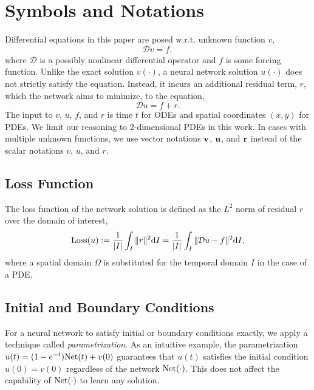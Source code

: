 
\chapter{Symbols and Notations} \label{chapter:symbols-and-notations}
    Differential equations in this paper are posed w.r.t. unknown function $v$,
    {
        \small
        \begin{equation}
            \mathcal{D} v = f,
        \end{equation}
    }
    where $\mathcal{D}$ is a possibly nonlinear differential operator and $f$ is some forcing function.
    Unlike the exact solution $v(\cdot)$, a neural network solution $u(\cdot)$ does not strictly satisfy the equation.
    Instead, it incurs an additional residual term, $r$, which the network aims to minimize, to the equation, 
    {
        \small
        \begin{equation}
            \mathcal{D} u = f + r.
        \end{equation}
    }
    The input to $v$, $u$, $f$, and $r$ is time $t$ for ODEs and spatial coordinates $(x, y)$ for PDEs.
    We limit our reasoning to 2-dimensional PDEs in this work.
    In cases with multiple unknown functions, we use vector notations $\mathbf{v}$, $\mathbf{u}$, and $\mathbf{r}$ instead of the scalar notations $v$, $u$, and $r$.

\section{Loss Function}
    The loss function of the network solution is defined as the $L^2$ norm of residual $r$ over the domain of interest,
    {
        \small
        \begin{align}
            \mathrm{Loss}{}(u) := \frac{1}{|I|} \int_{I} \|r\|^2 \mathrm{d}I = \frac{1}{|I|} \int_{I} \|\mathcal{D} u - f\|^2 \mathrm{d}I,
        \end{align}
    }
    where a spatial domain $\Omega$ is substituted for the temporal domain $I$ in the case of a PDE.

\section{Initial and Boundary Conditions}\label{section:initial-and-boundary-conditions}
    For a neural network to satisfy initial or boundary conditions exactly, we apply a technique called \textit{parametrization}. 
    As an intuitive example, the parametrization $u(t) = (1 - e^{-t}) \mathrm{Net}(t) + v(0)$ guarantees that $u(t)$ satisfies the initial condition $u(0)=v(0)$ regardless of the network $\mathrm{Net}(\cdot)$.
    This does not affect the capability of $\mathrm{Net}(\cdot)$ to learn any solution.

